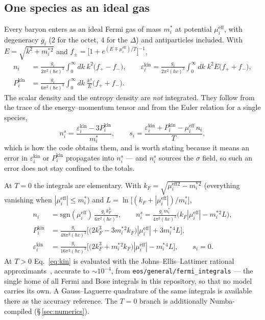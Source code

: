 \documentclass[aps,prc,onecolumn,superscriptaddress,nofootinbib,10pt]{revtex4-2}
\newcommand{\mueff}[1]{\mu^{\mathrm{eff}}_{#1}}
\newcommand{\meff}[1]{m^{*}_{#1}}
\begin{document}
\subsection{One species as an ideal gas}
\label{sec:kinetic}

Every baryon enters as an ideal Fermi gas of mass $\meff{i}$ at potential
$\mueff{i}$, with degeneracy $g_i$ ($2$ for the octet, $4$ for the $\Delta$)
and antiparticles included. With $E = \sqrt{k^2 + \meff{i}{}^2}$ and
$f_\pm = \big[ 1 + e^{(E \mp \mueff{i})/T} \big]^{-1}$,
%
\begin{align}
n_i &= \frac{g_i}{2\pi^2 (\hbar c)^3} \int_0^\infty \!\! dk\; k^2
       \big( f_+ - f_- \big) ,
\qquad
\varepsilon^{\mathrm{kin}}_i = \frac{g_i}{2\pi^2 (\hbar c)^3}
       \int_0^\infty \!\! dk\; k^2 E \big( f_+ + f_- \big) ,
\nonumber\\
P^{\mathrm{kin}}_i &= \frac{g_i}{6\pi^2 (\hbar c)^3} \int_0^\infty \!\! dk\;
       \frac{k^4}{E} \big( f_+ + f_- \big) .
\label{eq:kin}
\end{align}
%
The scalar density and the entropy density are \emph{not} integrated. They
follow from the trace of the energy--momentum tensor and from the Euler
relation for a single species,
%
\begin{equation}
n^s_i = \frac{\varepsilon^{\mathrm{kin}}_i - 3 P^{\mathrm{kin}}_i}{\meff{i}} ,
\qquad
s_i = \frac{\varepsilon^{\mathrm{kin}}_i + P^{\mathrm{kin}}_i
            - \mueff{i}\, n_i}{T} ,
\label{eq:nsandS}
\end{equation}
%
which is how the code obtains them, and is worth stating because it means an
error in $\varepsilon^{\mathrm{kin}}_i$ or $P^{\mathrm{kin}}_i$ propagates
into $n^s_i$ --- and $n^s_i$ sources the $\sigma$ field, so such an error does
not stay confined to the totals.

At $T = 0$ the integrals are elementary. With
$k_F = \sqrt{\mueff{i}{}^2 - \meff{i}{}^2}$ (everything vanishing when
$|\mueff{i}| \le \meff{i}$) and $L = \ln\big[(k_F + |\mueff{i}|)/\meff{i}\big]$,
%
\begin{align}
n_i &= \mathrm{sgn}(\mueff{i})\, \frac{g_i\, k_F^3}{6\pi^2 (\hbar c)^3} ,
\qquad
n^s_i = \frac{g_i\, \meff{i}}{4\pi^2 (\hbar c)^3}
        \Big( k_F |\mueff{i}| - \meff{i}{}^2 L \Big) ,
\nonumber\\
P^{\mathrm{kin}}_i &= \frac{g_i}{48\pi^2 (\hbar c)^3}
       \Big[ \big( 2k_F^3 - 3\meff{i}{}^2 k_F \big) |\mueff{i}|
             + 3 \meff{i}{}^4 L \Big] ,
\label{eq:T0}\\
\varepsilon^{\mathrm{kin}}_i &= \frac{g_i}{16\pi^2 (\hbar c)^3}
       \Big[ \big( 2k_F^3 + \meff{i}{}^2 k_F \big) |\mueff{i}|
             - \meff{i}{}^4 L \Big] ,
\qquad s_i = 0 .
\nonumber
\end{align}
%
At $T>0$ Eq.~\eqref{eq:kin} is evaluated with the Johns--Ellis--Lattimer
rational approximants~\cite{JohnsEllisLattimer1996}, accurate to
$\sim 10^{-4}$, from \texttt{eos/general/fermi\_integrals} --- the single home
of all Fermi and Bose integrals in this repository, so that no model carries
its own. A Gauss--Laguerre quadrature of the same integrals is available there
as the accuracy reference. The $T = 0$ branch is additionally Numba-compiled
(\S\,\ref{sec:numerics}).
\end{document}
